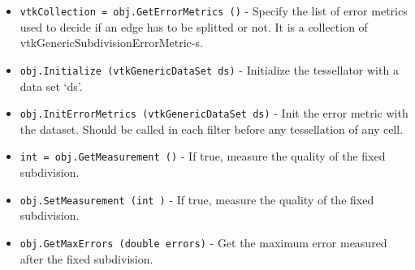 \begin{itemize}
\item  \verb|vtkCollection = obj.GetErrorMetrics ()| -  Specify the list of error metrics used to decide if an edge has to be
 splitted or not. It is a collection of vtkGenericSubdivisionErrorMetric-s.

\item  \verb|obj.Initialize (vtkGenericDataSet ds)| -  Initialize the tessellator with a data set `ds'.

\item  \verb|obj.InitErrorMetrics (vtkGenericDataSet ds)| -  Init the error metric with the dataset. Should be called in each filter
 before any tessellation of any cell.

\item  \verb|int = obj.GetMeasurement ()| -  If true, measure the quality of the fixed subdivision.

\item  \verb|obj.SetMeasurement (int )| -  If true, measure the quality of the fixed subdivision.

\item  \verb|obj.GetMaxErrors (double errors)| -  Get the maximum error measured after the fixed subdivision.
 
 

\end{itemize}

